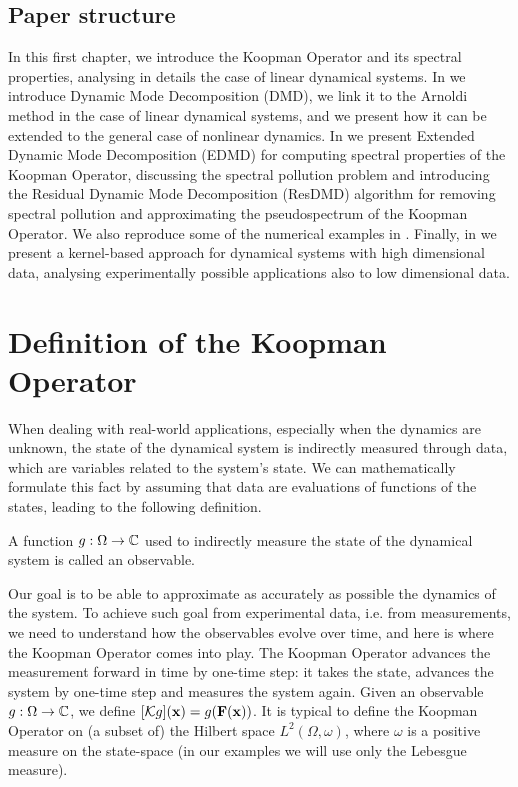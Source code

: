 \subsection{Paper structure}
In this first chapter, we introduce the Koopman Operator and its spectral properties, analysing in details the case of linear dynamical systems. In  we introduce Dynamic Mode Decomposition (DMD), we link it to the Arnoldi method in the case of linear dynamical systems, and we present how it can be extended to the general case of nonlinear dynamics. In  we present Extended Dynamic Mode Decomposition (EDMD) for computing spectral properties of the Koopman Operator, discussing the spectral pollution problem and introducing the Residual Dynamic Mode Decomposition (ResDMD) algorithm for removing spectral pollution and approximating the pseudospectrum of the Koopman Operator. We also reproduce some of the numerical examples in \cite{colbrook_rigorous_2021}. Finally, in  we present a kernel-based approach for dynamical systems with high dimensional data, analysing experimentally possible applications also to low dimensional data.

\section{Definition of the Koopman Operator}
When dealing with real-world applications, especially when the dynamics are unknown, the state of the dynamical system is indirectly measured through data, which are variables related to the system's state. We can mathematically formulate this fact by assuming that data are evaluations of functions of the states, leading to the following definition.

\begin{definition}[Observable]
A function $g:\Omega\to\mathbb{C}$ used to indirectly measure the state of the dynamical system is called an observable. 
\end{definition}

Our goal is to be able to approximate as accurately as possible the dynamics of the system. To achieve such goal from experimental data, i.e. from measurements, we need to understand how the observables evolve over time, and here is where the Koopman Operator comes into play. The Koopman Operator advances the measurement forward in time by one-time step: it takes the state, advances the system by one-time step and measures the system again. Given an observable $g:\Omega\to\mathbb{C}$, we define $[\mathcal{K}g](\vb{x}) = g(\vb{F}(\vb{x}))$. It is typical to define the Koopman Operator on (a subset of) the Hilbert space $L^2(\Omega, \omega)$, where $\omega$ is a positive measure on the state-space (in our examples we will use only the Lebesgue measure).


